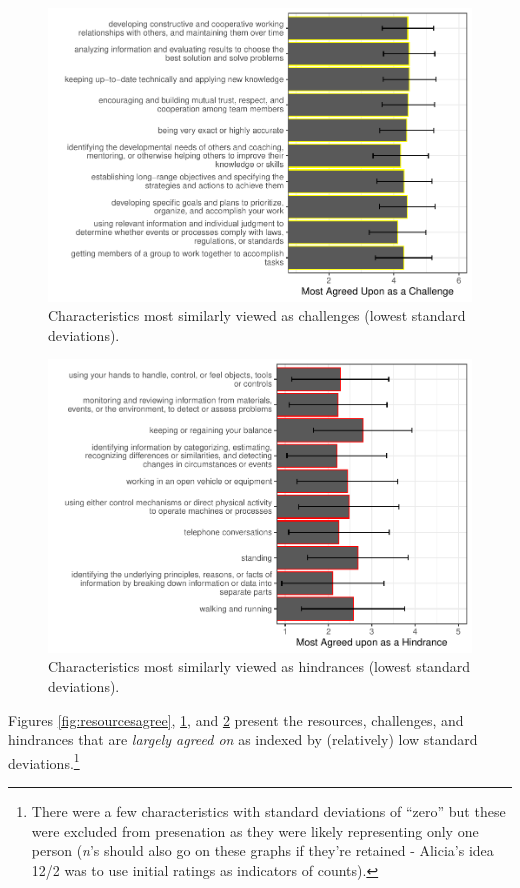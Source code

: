 \documentclass[
  man]{apa6}
\begin{document}
\begin{figure}
\centering
\includegraphics{Submission_files/figure-latex/challengesagree-1.pdf}
\caption{\label{fig:challengesagree}Characteristics most similarly viewed as challenges (lowest standard deviations).}
\end{figure}

\begin{figure}
\centering
\includegraphics{Submission_files/figure-latex/hindrancesagree-1.pdf}
\caption{\label{fig:hindrancesagree}Characteristics most similarly viewed as hindrances (lowest standard deviations).}
\end{figure}

Figures \ref{fig:resourcesagree}, \ref{fig:challengesagree}, and \ref{fig:hindrancesagree} present the resources, challenges, and hindrances that are \emph{largely agreed on} as indexed by (relatively) low standard deviations.\footnote{There were a few characteristics with standard deviations of ``zero'' but these were excluded from presenation as they were likely representing only one person (\emph{n}'s should also go on these graphs if they're retained - Alicia's idea 12/2 was to use initial ratings as indicators of counts).}
\end{document}
